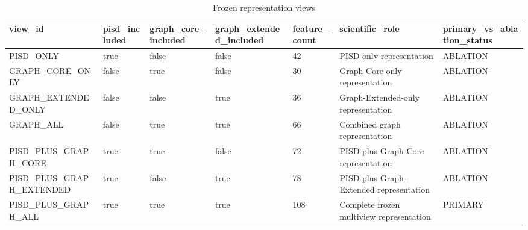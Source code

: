 \begin{longtable}{lllllll}
\caption{Frozen representation views}\\
\hline
view\_id & pisd\_included & graph\_core\_included & graph\_extended\_included & feature\_count & scientific\_role & primary\_vs\_ablation\_status \\
\hline
PISD\_ONLY & true & false & false & 42 & PISD-only representation & ABLATION \\
GRAPH\_CORE\_ONLY & false & true & false & 30 & Graph-Core-only representation & ABLATION \\
GRAPH\_EXTENDED\_ONLY & false & false & true & 36 & Graph-Extended-only representation & ABLATION \\
GRAPH\_ALL & false & true & true & 66 & Combined graph representation & ABLATION \\
PISD\_PLUS\_GRAPH\_CORE & true & true & false & 72 & PISD plus Graph-Core representation & ABLATION \\
PISD\_PLUS\_GRAPH\_EXTENDED & true & false & true & 78 & PISD plus Graph-Extended representation & ABLATION \\
PISD\_PLUS\_GRAPH\_ALL & true & true & true & 108 & Complete frozen multiview representation & PRIMARY \\
\hline
\end{longtable}
